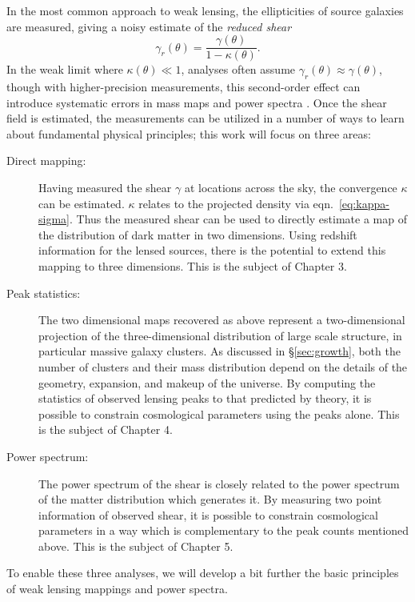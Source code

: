 In the most common approach to weak lensing,
the ellipticities of source galaxies are measured, 
giving a noisy estimate of the {\it reduced shear}
\begin{equation}
  \gamma_r(\theta) = \frac{\gamma(\theta)}{1 - \kappa(\theta)}.
\end{equation}
In the weak limit where $\kappa(\theta) \ll 1$, analyses often assume
$\gamma_r(\theta) \approx \gamma(\theta)$, though with higher-precision
measurements, this second-order effect can introduce systematic
errors in mass maps and power spectra \citep{Dodelson06, Shapiro09, Krause10}.
Once the shear field is estimated, the
measurements can be utilized in a number of ways to learn about
fundamental physical principles; this work will focus on three areas:
\begin{description}
  \item[Direct mapping:] Having measured the shear $\gamma$ at locations
    across the sky, the convergence $\kappa$ can be estimated.  $\kappa$
    relates to the projected density via eqn.~\ref{eq:kappa-sigma}.  Thus
    the measured shear can be used to directly estimate a map of the
    distribution of dark matter in two dimensions.  Using redshift
    information for the lensed sources, there is the potential to extend
    this mapping to three dimensions. This is the subject of Chapter 3.
  \item[Peak statistics:] The two dimensional maps recovered as above
    represent a two-dimensional projection of the three-dimensional
    distribution of large scale structure, in particular massive galaxy
    clusters.  As discussed in \S\ref{sec:growth}, both the number of
    clusters and their mass distribution depend on the details of the
    geometry, expansion, and makeup of the universe.  By computing the
    statistics of observed lensing peaks to 
    that predicted by theory, it is possible to
    constrain cosmological parameters using the peaks alone.  This is
    the subject of Chapter 4.
  \item[Power spectrum:] The power spectrum of the shear is closely related
    to the power spectrum of the matter distribution which generates it.
    By measuring two point information of observed shear, it is possible
    to constrain cosmological parameters in a way which is complementary
    to the peak counts mentioned above.  This is the subject of Chapter 5.
\end{description}

To enable these three analyses, we will develop a bit further the basic
principles of weak lensing mappings and power spectra.

